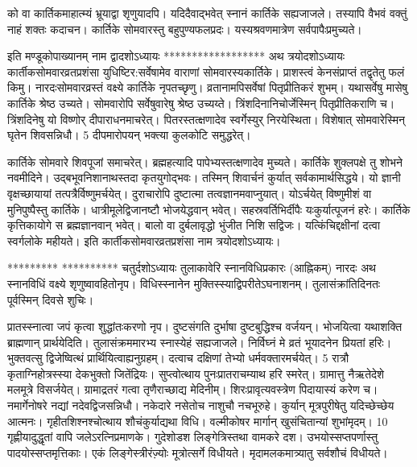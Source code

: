 को वा कार्तिकमाहात्म्यं भ्रूयाद्वा शृणुयादपि।
 यदिदैवाद्भवेत् स्नानं कार्तिके सह्यजाजले।
 तस्यापि वैभवं वक्तुं नाहं शक्तः कदाचन।
 कार्तिके सोमवारस्तु बहुपुण्यफलप्रदः।
 यस्यश्रवणमात्रेण सर्वपापैःप्रमुच्यते।
 
इति मण्डूकोपाख्यानम् नाम द्वादशोऽध्यायः
******************
अथ त्रयोदशोऽध्यायः
कार्तीकसोमवारव्रतप्रशंसा युधिष्टिर:सर्वेषामेव वाराणां सोमवारस्यकार्तिके।
 प्राशस्त्वं केनसंप्राप्तं तद्वृतेतु फलं किमु।
 नारदःसोमवारव्रस्तं वक्ष्ये कार्तिके नृपतच्छृणु।
 व्रतानामपिसर्वेषां पितृप्रीतिकरं शुभम्।
 यथासर्वेषु मासेषु कार्तिके श्रेष्ठ उच्यते।
 सोमवारोपि सर्वेषुवारेषु श्रेष्ठ उच्यय्ते।
 त्रिंशदिनानिचोर्जेस्मिन् पितृप्रीतिकराणि च।
 त्रिंशदिनेषु यो विष्णोर् दीपाराधनमाचरेत्।
 पितरस्तत्क्षणादेव स्वर्गेस्युर् निरयेस्थिता।
 विशेषात् सोमवारेस्मिन् घृतेन शिवसन्निधौ।
 5 दीपमारोपयन् भक्त्या कुलकोटि समुद्धरेत्।
 
कार्तिके सोमवारे शिवपूजां समाचरेत्।
 ब्रह्महत्यादि पापेभ्यस्तत्क्षणादेव मुच्यते।
 कार्तिके शुक्लपक्षे तु शोभने नवमीदिने।
 उद्बभूवनिशानाथस्तदा कृतयुगोद्भवः।
 तस्मिन् शिवार्चनं कुर्यात् सर्वकामार्थसिद्धये।
 यो ज्ञानी वृक्षच्छायायां तत्पत्रैर्विष्णुमर्चयेत्।
 दुराचारोपि दुष्टात्मा तत्वज्ञानमवाप्नुयात्।
 योऽर्चयेत् विष्णुमीशं वा मुनिपुष्पैस्तु कार्तिके।
 धात्रीमूलेद्विजानष्टौ भोजयेद्धवान् भवेत्।
 सहस्रवर्तिभिर्दीपैः यःकुर्यात्पूजनं हरेः।
 कार्तिके कृत्तिकायोगे स ब्रह्मज्ञानवान् भवेत्।
 बालो वा दुर्बलावृद्धो भुंजीत निशि सद्विजः।
 यत्किंचिद्दक्षीनां दत्वा स्वर्गलोके महीयते।
 इति कार्तीकसोमवारव्रतप्रशंसा नाम
त्रयोदशोऽध्यायः।

*********
**********
चतुर्दशोऽध्यायः तुलाकावेरि स्नानविधिप्रकारः (आह्निकम्)
नारदः
अथ स्नानविधिं वक्ष्ये शृणुष्वावहितोनृप।
 विधिस्स्नानेन मुक्तिस्स्याद्विपरीतेऽघनाशनम्।
 तुलासंक्रांतिदिनतः पूर्वस्मिन् दिवसे शुचिः।
 
प्रातस्स्नात्वा जपं कृत्वा शुद्धांतःकरणो नृप।
 दुष्टसंगति दुर्भाषा दुष्टबुद्धिश्च वर्जयन्।
 भोजयित्वा यथाशक्ति ब्राह्मणान् प्रार्थयेदिति।
 तुलासंक्रममारभ्य स्नास्येहं सह्यजाजले।
 निर्विघ्नं मे व्रतं भूयादनेन प्रियतां हरिः।
 भुक्तवत्सु द्विजेष्वित्थं प्रार्थियित्वाह्यनुग्रहम्।
 दत्वाच दक्षिणां तेभ्यो धर्मवक्तारमर्चयेत्।
 5 रात्रौ कृताग्निहोत्रस्स्या देकभुक्तो जितेंद्रियः।
 सुप्त्वोत्थाय पुनःप्रातराचम्याथ हरि स्मरेत्।
 ग्रामात्तु नैऋतेदेशे मलमूत्रे विसर्जयेत्।
 ग्रामाद्रतरं गत्वा तृणैराच्छाद्य मेदिनीम्।
 शिरःप्रावृत्यवस्त्रेण पिदायास्यं करेण च।
 नमार्गेनोषरे नद्यां नदेवद्विजसन्निधौ।
 नकेदारे नसेतोच नाशुचौ नचभूरुहे।
 कुर्यान् मूत्रपुरीषेतु यदिच्छेच्छेय आत्मनः।
 गृहीतशिश्नश्चोत्थाय शौचंकुर्याद्यथा विधि।
 वल्मीकोषर मार्गान् खुसंचितान्यां शुभांमृदम्।
 10 गृह्णीयादुद्धृतां वापि जलेऽरत्निप्रमाणके।
 गुदेशोडश लिङ्गेत्रिस्तथा वामकरे दश।
 उभयोस्सप्तपर्णास्तु पादयोस्सप्तमृत्तिकाः।
 एकं लिङ्गेस्त्रीरंज़्योः मूत्रोत्सर्गे विधीयते।
 मृदामलकमात्र्यातु सर्वशौचं विधीयते।
 
